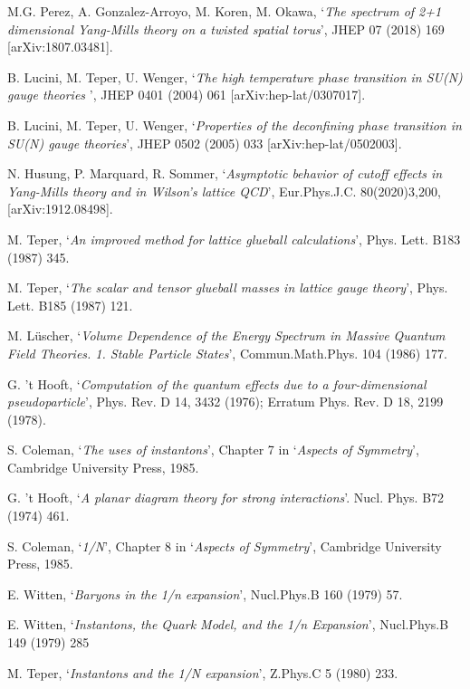 \documentclass[12pt]{article}
\begin{document}
\begin{thebibliography}{99}
  M.G. Perez, A. Gonzalez-Arroyo, M. Koren, M. Okawa,
  `{\it The spectrum of 2+1 dimensional Yang-Mills theory on a twisted spatial torus}',
  JHEP 07 (2018) 169 [arXiv:1807.03481].

  B. Lucini, M. Teper, U. Wenger,
  `{\it The high temperature phase transition in SU(N) gauge theories }',
  JHEP 0401 (2004) 061 [arXiv:hep-lat/0307017].

  B. Lucini, M. Teper, U. Wenger,
  `{\it Properties of the deconfining phase transition in SU(N) gauge theories}',
  JHEP 0502 (2005) 033 [arXiv:hep-lat/0502003].


  N. Husung, P. Marquard, R. Sommer,
  `{\it Asymptotic behavior of cutoff effects in Yang-Mills theory and in Wilson's lattice QCD}',
  Eur.Phys.J.C. 80(2020)3,200, [arXiv:1912.08498].
  
  M. Teper,
  `{\it An improved method for lattice glueball calculations}',
  Phys. Lett. B183 (1987) 345.
  
  M. Teper, 
  `{\it The scalar and tensor glueball masses in lattice gauge theory}',
  Phys. Lett. B185 (1987) 121.

  M. L\"uscher,
  `{\it Volume Dependence of the Energy Spectrum in Massive Quantum Field Theories. 1. Stable Particle States}',
  Commun.Math.Phys. 104 (1986) 177.

  
  G. 't Hooft,
 `{\it Computation of the quantum effects due to a four-dimensional pseudoparticle}',
  Phys. Rev. D 14, 3432 (1976); Erratum Phys. Rev. D 18, 2199 (1978).
  
  S. Coleman,
  `{\it The uses of instantons}',
  Chapter 7 in `{\it Aspects of Symmetry}',  Cambridge University Press, 1985.

  
  G. 't Hooft,
 `{\it A planar diagram theory for strong interactions}'. 
  Nucl. Phys. B72 (1974) 461.

  S. Coleman,
  `{\it 1/N}',
  Chapter 8 in `{\it Aspects of Symmetry}',  Cambridge University Press, 1985.

  E. Witten,
  `{\it Baryons in the 1/n expansion}',
  Nucl.Phys.B 160 (1979) 57.

  
  E. Witten,
  `{\it Instantons, the Quark Model, and the 1/n Expansion}',
  Nucl.Phys.B 149 (1979) 285

  M. Teper, 
  `{\it Instantons and the 1/N expansion}',
  Z.Phys.C 5 (1980) 233.


\end{thebibliography}
\end{document}
